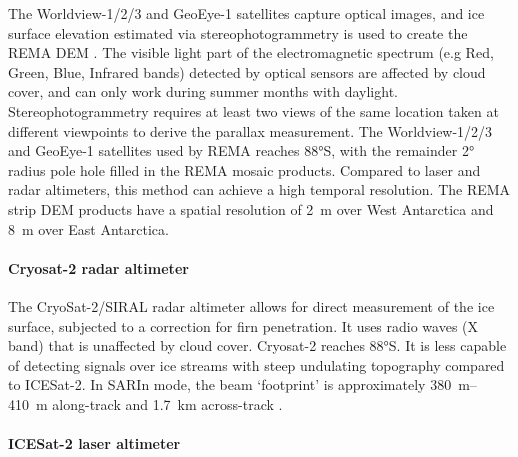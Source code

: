 The Worldview-1/2/3 and GeoEye-1 satellites capture optical images, and ice surface elevation estimated via stereophotogrammetry is used to create the REMA \gls{DEM} \citep{HowatReferenceElevationModel2019}.
The visible light part of the electromagnetic spectrum (e.g Red, Green, Blue, Infrared bands) detected by optical sensors are affected by cloud cover, and can only work during summer months with daylight.
Stereophotogrammetry requires at least two views of the same location taken at different viewpoints to derive the parallax measurement.
The Worldview-1/2/3 and GeoEye-1 satellites used by REMA reaches 88°S, with the remainder 2° radius pole hole filled in the REMA mosaic products.
Compared to laser and radar altimeters, this method can achieve a high temporal resolution.
The REMA strip \gls{DEM} products have a spatial resolution of \SI{2}{\metre} over West Antarctica and \SI{8}{\metre} over East Antarctica.

\paragraph{Cryosat-2 radar altimeter}

The CryoSat-2/SIRAL radar altimeter \citep[2010- ;][]{WinghamCryoSatmissiondetermine2006} allows for direct measurement of the ice surface, subjected to a correction for firn penetration.
It uses radio waves (X band) that is unaffected by cloud cover.
Cryosat-2 reaches 88°S.
It is less capable of detecting signals over ice streams with steep undulating topography compared to ICESat-2.
In SARIn mode, the beam `footprint' is approximately \SIrange{380}{410}{\metre} along-track and \SI{1.7}{\kilo\metre} across-track \citep{McMillanThreedimensionalmappingCryoSat22013}.

\paragraph{ICESat-2 laser altimeter}

